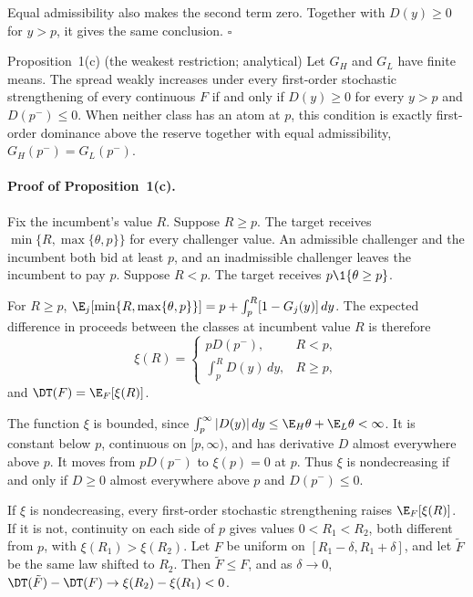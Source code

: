 Equal admissibility also makes the second term zero. Together with \(D(y)\ge0\) for \(y>p\), it gives the same
conclusion. \(\square\)

\begin{named}{Proposition~1(c) (the weakest restriction; analytical)}
Let \(G_H\) and \(G_L\) have finite means. The spread weakly increases under every first-order stochastic
strengthening of every continuous \(F\) if and only if \(D(y)\ge0\) for every \(y>p\) and \(D(p^-)\le0\).
When neither class has an atom at \(p\), this condition is exactly first-order dominance above the reserve
together with equal admissibility, \(G_H(p^-)=G_L(p^-)\).
\end{named}

\paragraph{Proof of Proposition~1(c).}
Fix the incumbent's value \(R\). Suppose \(R\ge p\). The target receives \(\min\{R,\max\{\theta,p\}\}\) for every
challenger value. An admissible challenger and the incumbent both bid at least \(p\), and an inadmissible
challenger leaves the incumbent to pay \(p\). Suppose \(R<p\). The target receives \(p\1\{\theta\ge p\}\).

For \(R\ge p\), \(\E_j[\min\{R,\max\{\theta,p\}\}]=p+\int_p^R[1-G_j(y)]\,dy\). The expected difference in
proceeds between the classes at incumbent value \(R\) is therefore
\[
\xi(R)=
\begin{cases}
pD(p^-), & R<p,\\[3pt]
\int_p^RD(y)\,dy, & R\ge p,
\end{cases}
\]
and \(\DT(F)=\E_F[\xi(R)]\).

The function \(\xi\) is bounded, since \(\int_p^\infty|D(y)|\,dy\le\E_H\theta+\E_L\theta<\infty\). It is
constant below \(p\), continuous on \([p,\infty)\), and has derivative \(D\) almost everywhere above \(p\). It
moves from \(pD(p^-)\) to \(\xi(p)=0\) at \(p\). Thus \(\xi\) is nondecreasing if and only if \(D\ge0\) almost
everywhere above \(p\) and \(D(p^-)\le0\).

If \(\xi\) is nondecreasing, every first-order stochastic strengthening raises \(\E_F[\xi(R)]\). If it is not,
continuity on each side of \(p\) gives values \(0<R_1<R_2\), both different from \(p\), with
\(\xi(R_1)>\xi(R_2)\). Let \(F\) be uniform on \([R_1-\delta,R_1+\delta]\), and let \(\tilde F\) be the same law
shifted to \(R_2\). Then \(\tilde F\le F\), and as \(\delta\to0\),
\(\DT(\tilde F)-\DT(F)\to\xi(R_2)-\xi(R_1)<0\).


